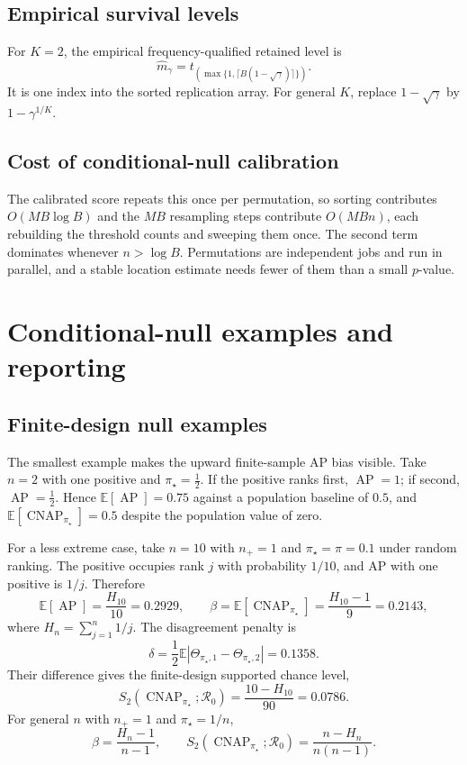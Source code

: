 \documentclass[11pt]{article}
\newcommand{\AP}{\operatorname{AP}}
\newcommand{\CNAP}{\operatorname{CNAP}}
\newcommand{\Regime}{\mathcal{R}}
\newcommand{\Tpi}{\CNAP_{\pi_\star}}
\newcommand{\E}{\mathbb{E}}
\theoremstyle{remark}
\begin{document}
\subsection{Empirical survival levels}
\label{app:survival-computation}

For $K=2$, the empirical frequency-qualified retained level is
\[
\widehat m_\gamma
=
t_{\left(\max\{1,\lceil B(1-\sqrt{\gamma})\rceil\}\right)}.
\]
It is one index into the sorted replication array. For general $K$, replace $1-\sqrt{\gamma}$ by $1-\gamma^{1/K}$.

\subsection{Cost of conditional-null calibration}

The calibrated score repeats this once per permutation, so sorting contributes $O(MB\log B)$ and the $MB$ resampling steps contribute $O(MBn)$, each rebuilding the threshold counts and sweeping them once. The second term dominates whenever $n>\log B$. Permutations are independent jobs and run in parallel, and a stable location estimate needs fewer of them than a small $p$-value.

\section{Conditional-null examples and reporting}

\subsection{Finite-design null examples}
\label{app:null-examples}

The smallest example makes the upward finite-sample AP bias visible. Take $n=2$ with one positive and $\pi_\star=\tfrac12$. If the positive ranks first, $\AP=1$; if second, $\AP=\tfrac12$. Hence $\E[\AP]=0.75$ against a population baseline of $0.5$, and $\E[\Tpi]=0.5$ despite the population value of zero.

For a less extreme case, take $n=10$ with $n_+=1$ and $\pi_\star=\pi=0.1$ under random ranking. The positive occupies rank $j$ with probability $1/10$, and AP with one positive is $1/j$. Therefore
\[
\E[\AP]=\frac{H_{10}}{10}=0.2929,
\qquad
\beta=\E[\Tpi]=\frac{H_{10}-1}{9}=0.2143,
\]
where $H_n=\sum_{j=1}^n1/j$. The disagreement penalty is
\[
\delta
=
\frac12\E\left|\Theta_{\pi_\star,1}-\Theta_{\pi_\star,2}\right|
=
0.1358.
\]
Their difference gives the finite-design supported chance level,
\begin{equation}
S_2(\CNAP_{\pi_\star};\Regime_0)
=
\frac{10-H_{10}}{90}
=
0.0786.
\label{eq:worked-null}
\end{equation}
For general $n$ with $n_+=1$ and $\pi_\star=1/n$,
\[
\beta=\frac{H_n-1}{n-1},
\qquad
S_2(\CNAP_{\pi_\star};\Regime_0)
=
\frac{n-H_n}{n(n-1)}.
\]
\end{document}
